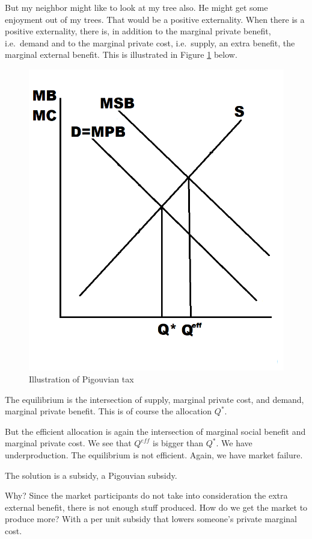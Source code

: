 \documentclass[
]{book}
\begin{document}
But my neighbor might like to look at my tree also. He might get some enjoyment out of my trees. That would be a positive externality. When there is a positive externality, there is, in addition to the marginal private benefit, i.e.~demand and to the marginal private cost, i.e.~supply, an extra benefit, the marginal external benefit. This is illustrated in Figure \ref{fig:extfig3} below.

\begin{figure}

{\centering \includegraphics[width=0.75\linewidth]{img/externalities/extfig3} 

}

\caption{Illustration of Pigouvian tax}\label{fig:extfig3}
\end{figure}

The equilibrium is the intersection of supply, marginal private cost, and demand, marginal private benefit. This is of course the allocation \(Q^*\).

But the efficient allocation is again the intersection of marginal social benefit and marginal private cost. We see that \(Q^{eff}\) is bigger than \(Q^*\). We have underproduction. The equilibrium is not efficient. Again, we have market failure.

The solution is a subsidy, a Pigouvian subsidy.

Why? Since the market participants do not take into consideration the extra external benefit, there is not enough stuff produced. How do we get the market to produce more? With a per unit subsidy that lowers someone's private marginal cost.
\end{document}

